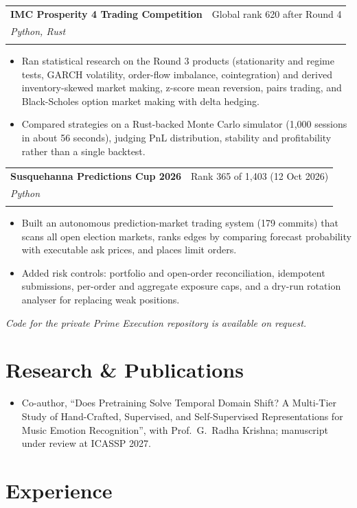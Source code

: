 \documentclass[letterpaper,10pt]{article}
\makeatletter
\newcommand{\entry}[4]{%
  \vspace{2pt}
  \begin{tabularx}{\linewidth}{@{}X@{\hspace{6pt}}r@{}}
    \textbf{#1} & #2 \\
    \if\relax\detokenize{#3}\relax\else \textit{\small #3} & \textit{\small #4} \\ \fi
  \end{tabularx}\vspace{-3pt}
}
\makeatother
\begin{document}
\entry{IMC Prosperity 4 Trading Competition}{Global rank 620 after Round 4}
      {Python, Rust}{}
\begin{itemize}
  \item Ran statistical research on the Round 3 products (stationarity and regime tests, GARCH volatility, order-flow
        imbalance, cointegration) and derived inventory-skewed market making, z-score mean reversion, pairs trading, and
        Black-Scholes option market making with delta hedging.
  \item Compared strategies on a Rust-backed Monte Carlo simulator (1,000 sessions in about 56 seconds), judging PnL
        distribution, stability and profitability rather than a single backtest.
\end{itemize}

\entry{Susquehanna Predictions Cup 2026}{Rank 365 of 1,403 (12 Oct 2026)}
      {Python}{}
\begin{itemize}
  \item Built an autonomous prediction-market trading system (179 commits) that scans all open election markets, ranks
        edges by comparing forecast probability with executable ask prices, and places limit orders.
  \item Added risk controls: portfolio and open-order reconciliation, idempotent submissions, per-order and aggregate
        exposure caps, and a dry-run rotation analyser for replacing weak positions.
\end{itemize}

{\footnotesize\textit{Code for the private Prime Execution repository is available on request.}}

\section{Research \& Publications}
\begin{itemize}
  \item Co-author, ``Does Pretraining Solve Temporal Domain Shift? A Multi-Tier Study of Hand-Crafted, Supervised, and
        Self-Supervised Representations for Music Emotion Recognition'', with Prof.~G.~Radha Krishna; manuscript under
        review at ICASSP 2027.
\end{itemize}

\section{Experience}
\end{document}
